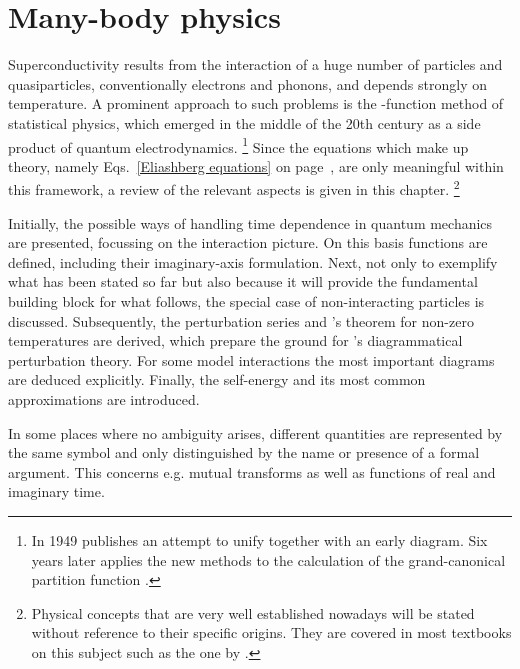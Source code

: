 
\chapter{Many-body physics}
\label{many-body physics}

Superconductivity results from the interaction of a huge number of particles and
quasiparticles, conventionally electrons and phonons, and depends strongly on
temperature. A prominent approach to such problems is the -function
method of statistical physics, which emerged in the middle of the 20th century
as a side product of quantum electrodynamics.%
%
\footnote{In 1949  publishes an attempt to unify  \cite{Dyson49a} together with an
early  diagram. Six years later  applies the new
methods to the calculation of the grand-canonical partition function
\cite{Matsubara55}.}
%
Since the equations which make up  theory, namely
Eqs.~\ref{Eliashberg equations} on page~\pageref{Eliashberg equations}, are only
meaningful within this framework, a review of the relevant aspects is given in
this chapter.%
%
\footnote{Physical concepts that are very well established nowadays will be
stated without reference to their specific origins. They are covered in most
textbooks on this subject such as the one by  \cite{Mahan00}.}

Initially, the possible ways of handling time dependence in quantum mechanics
are presented, focussing on the interaction picture. On this basis 
functions are defined, including their imaginary-axis formulation. Next, not
only to exemplify what has been stated so far but also because it will provide
the fundamental building block for what follows, the special case of
non-interacting particles is discussed. Subsequently, the perturbation series
and 's theorem for non-zero temperatures are derived, which prepare
the ground for 's diagrammatical perturbation theory. For some
model interactions the most important diagrams are deduced explicitly. Finally,
the self-energy and its most common approximations are introduced.

In some places where no ambiguity arises, different quantities are represented
by the same symbol and only distinguished by the name or presence of a formal
argument. This concerns e.g. mutual  transforms as well as
functions of real and imaginary time.

